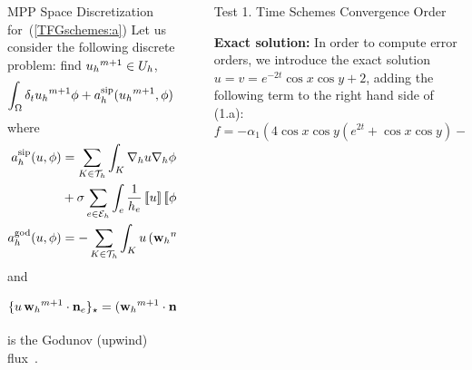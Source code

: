 \documentclass[final]{beamer}
\newlength{\sepwid}
\newlength{\onecolwid}
\begin{document}
\begin{frame}[t]
\begin{columns}[t]
\begin{column}{\onecolwid}
\begin{block}{MPP Space Discretization for~(\ref{TFGschemes:a})}
        Let us consider the following discrete problem: find
        ${{u_{h}}^{m+1}}\in U_h$,
        \begin{equation}
        \label{discrete_problem_u}
          \int_\Omega \delta_t{{u_{h}}^{m+1}} \phi + a_h^{\mathrm{sip}}({{u_{h}}^{m+1}},\phi) + a_h^{\mathrm{god}}({{u_{h}}^{m+1}},\phi)=0 \quad \forall\phi\in U_h,
        \end{equation}
        where
        \begin{align*}
          \asip(u,\phi) &= \sum_{K\in\mathcal{T}_h}\int_K\nabla_h u\nabla_h \phi-\sum_{e\in\mathcal{E}_h}\int_e\left(\average{\nabla_h u\cdot\mathbf{n}_e}\jump{\phi}+\average{\nabla_h \phi\cdot\mathbf{n}_e}\jump{u}\right)\\&+\sigma\sum_{e\in\mathcal{E}_h}\int_e\frac{1}{h_e}\jump{u}\jump{\phi},
          \\
          \agod(u,\phi) &= -\sum_{K \in\mathcal{T}_h} \int_K u \, (\wwmm\cdot \grad\phi)
                            + \sum_{e\in\Eh}\{ u \, \wwmm \cdot \nn_e\}_\star
        \end{align*}
        and
        $$
        \{ u \, {{\mathbf{w}_{h}}^{m+1}} \cdot \mathbf{n}_e\}_\star=({{\mathbf{w}_{h}}^{m+1}}\cdot \mathbf{n}_e)\left(\frac{u|_{K_1}+u|_{K_2}}{2}\right)-\frac{1}{2}|{{\mathbf{w}_{h}}^{m+1}}\cdot\mathbf{n}_e|\left[\!\left[u\right]\!\right]
        $$
        is the Godunov (upwind) flux~\cite{anderson_high-order_2017}.

      \end{block}

    \end{column}



    \begin{column}{\sepwid}  \end{column}

    \vspace*{0.5cm}

    \begin{column}{\onecolwid} %

      \begin{block}{Test 1. Time Schemes Convergence Order}

        {\small
          \textbf{Exact solution:} In order to compute error orders, we introduce the exact solution $u=v=e^{-2t}\cos{x}\cos{y}+2$, adding the following term to the right hand side of (1.a):
          $$f=-\alpha_1 (4\cos{x}\cos{y}(e^{2t}+\cos{x}\cos{y})-\cos^2{x}-\cos^2{y})e^{-4t}.$$

}
\end{block}
\end{column}
\end{columns}
\end{frame}
\end{document}
